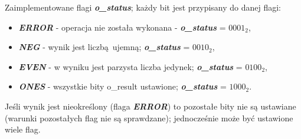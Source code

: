 Zaimplementowane flagi \textbf{\emph{o\_status}}; każdy bit jest przypisany do danej flagi:

\begin{itemize}
	\item \emph{\textbf{ERROR}} - operacja nie została wykonana - \textbf{\emph{o\_status}} = \(0001_2\),
	\item \emph{\textbf{NEG}} - wynik jest liczbą ujemną; \textbf{\emph{o\_status}} = \(0010_2\),
	\item \emph{\textbf{EVEN}} - w wyniku jest parzysta liczba jedynek; \textbf{\emph{o\_status}} = \(0100_2\),
	\item \emph{\textbf{ONES}} - wszystkie bity o\_result ustawione; \textbf{\emph{o\_status}} = \(1000_2\).
\end{itemize}

\noindent
Jeśli wynik jest nieokreślony (flaga \emph{\textbf{ERROR}}) to pozostałe bity nie są ustawiane (warunki pozostałych flag nie są sprawdzane); jednocześnie może być ustawione wiele flag.